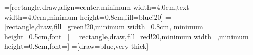 
\def\boxwidth{4.0cm}
\def\boxheight{0.8cm}
\pgfmathsetlengthmacro{\appwidth}{\boxwidth/3 - 0.3cm}

=[rectangle,draw,align=center,minimum width=\boxwidth,text width=\boxwidth,minimum height=\boxheight,fill=blue!20]
=[rectangle,draw,fill=green!20,minimum width=0.8cm,
minimum height=0.5cm,font=\scriptsize]
=[rectangle,draw,fill=red!20,minimum width=\appwidth,minimum height=\boxheight,font=\scriptsize]
=[draw=blue,very thick]
